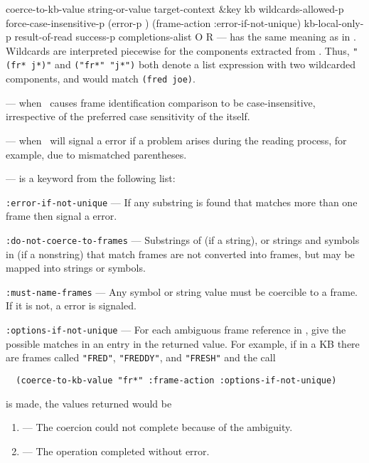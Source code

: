 \begin{okbcop}{coerce-to-kb-value}{ string-or-value target-context \&key kb wildcards-allowed-p force-case-insensitive-p (error-p \true) (frame-action :error-if-not-unique) kb-local-only-p} { result-of-read success-p completions-alist } { O } { R } {  }
    --- has the same meaning as in .  Wildcards are
        interpreted piecewise for the components extracted from
        .  Thus, {\tt "(fr* j*)"} and
        {\tt ("fr*" "j*")} both denote a list
        expression with two wildcarded components, and would match
        \verb|(fred joe)|.
  \item {}
    --- when \true\ causes frame identification comparison to be
        case-insensitive, irrespective of the preferred case sensitivity of the
         itself.
  \item {}
    --- when \true\ will signal a  error if a
        problem arises during the reading process, for example, due to
        mismatched parentheses.
  \item{}
    --- is a keyword from the following list:
        \bitem
        \item {\tt :error-if-not-unique}
          --- If any substring is found that matches more than one frame then
            signal a  error.
        \item {\tt :do-not-coerce-to-frames}
          --- Substrings of  (if a string), or strings
              and symbols in  (if a nonstring) that
              match frames are not converted into frames, but may be mapped
              into strings or symbols.
        \item {\tt :must-name-frames}
          --- Any symbol or string value must be coercible to a frame.  If it
              is not, a  error is signaled.
        \item {\tt :options-if-not-unique}
          --- For each ambiguous frame reference in ,
              give the possible matches in an entry in the
               returned value.
        \eitem
  \eitem
  For example, if in a KB there are frames called {\tt "FRED"},
  {\tt "FREDDY"}, and {\tt "FRESH"} and the call
  \begin{verbatim}
  (coerce-to-kb-value "fr*" :frame-action :options-if-not-unique)
  \end{verbatim}
  is made, the values returned would be
  \begin{enumerate}
  \item \false  --- The coercion could not complete because of
  the ambiguity.
  \item \true --- The operation completed without error.

\end{enumerate}
\end{okbcop}
